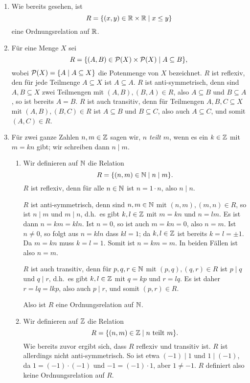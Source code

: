\begin{bsp}
 \begin{enumerate}[leftmargin=*]

  \item
   Wie bereits gesehen, ist
   \[
    R = \{(x,y) \in \mathbb{R} \times \mathbb{R} \mid x \leq y\}
   \]
   eine Ordnungsrelation auf $\mathbb{R}$.
   
  \item
   Für eine Menge $X$ sei
   \[
    R = \{(A,B) \in \mathcal{P}(X) \times \mathcal{P}(X) \mid A \subseteq B\},
   \]
   wobei $\mathcal{P}(X) = \{A \mid A \subseteq X\}$ die Potenmenge von $X$ bezeichnet. $R$ ist reflexiv, den für jede Teilmenge $A \subseteq X$ ist $A \subseteq A$. $R$ ist anti-symmetrisch, denn sind $A, B \subseteq X$ zwei Teilmengen mit $(A,B), (B,A) \in R$, also $A \subseteq B$ und $B \subseteq A$, so ist bereits $A = B$. $R$ ist auch transitiv, denn für Teilmengen $A,B,C \subseteq X$ mit $(A,B), (B,C) \in R$ ist $A \subseteq B$ und $B \subseteq C$, also auch $A \subseteq C$, und somit $(A,C) \in R$.
   
  \item
   Für zwei ganze Zahlen $n,m \in \mathbb{Z}$ sagen wir, \emph{$n$ teilt $m$}, wenn es ein $k \in \mathbb{Z}$ mit $m = kn$ gibt; wir schreiben dann $n \mid m$.
   \begin{enumerate}[label=\alph*)]
    \item
     Wir definieren auf $\mathbb{N}$ die Relation
     \[
      R = \{(n,m) \in \mathbb{N} \mid n \mid m\}.
     \]
     $R$ ist reflexiv, denn für alle $n \in \mathbb{N}$ ist $n = 1 \cdot n$, also $n \mid n$.
     
     $R$ ist anti-symmetrisch, denn sind $n,m \in \mathbb{N}$ mit $(n,m), (m,n) \in R$, so ist $n \mid m$ und $m \mid n$, d.h.\ es gibt $k,l \in \mathbb{Z}$ mit $m = kn$ und $n = lm$. Es ist dann $n = km = kln$. Ist $n = 0$, so ist auch $m = kn = 0$, also $n = m$. Ist $n \neq 0$, so folgt aus $n = kln$ dass $kl = 1$; da $k,l \in \mathbb{Z}$ ist bereits $k = l = \pm 1$. Da $m = kn$ muss $k = l = 1$. Somit ist $n = k m = m$. In beiden Fällen ist also $n = m$.
     
     $R$ ist auch transitiv, denn für $p,q,r \in \mathbb{N}$ mit $(p,q), (q,r) \in R$ ist $p \mid q$ und $q \mid r$, d.h.\ es gibt $k,l \in \mathbb{Z}$ mit $q = kp$ und $r = lq$. Es ist daher $r = lq = lkp$, also auch $p \mid r$, und somit $(p,r) \in R$.
     
     Also ist $R$ eine Ordnungsrelation auf $\mathbb{N}$.
    \item
     Wir definieren auf $\mathbb{Z}$ die Relation
     \[
      R = \{(n,m) \in \mathbb{Z} \mid \text{$n$ teilt $m$}\}.
     \]
     Wie bereits zuvor ergibt sich, dass $R$ reflexiv und transitiv ist. $R$ ist allerdings nicht anti-symmetrisch. So ist etwa $(-1) \mid 1$ und $1 \mid (-1)$, da $1 = (-1) \cdot (-1)$ und $-1 = (-1) \cdot 1$, aber $1 \neq -1$. $R$ definiert also keine Ordnungsrelation auf $R$.
   \end{enumerate}
 \end{enumerate}
\end{bsp}

